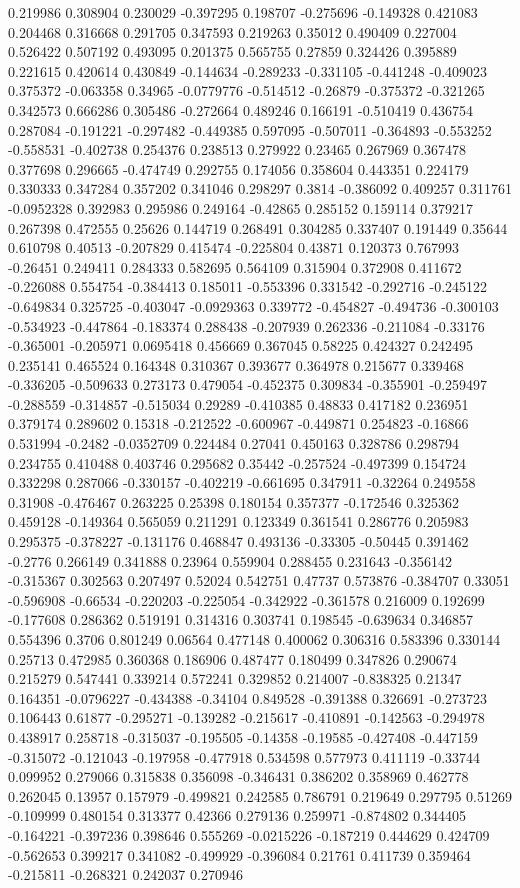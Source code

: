 0.219986 0.308904 0.230029 -0.397295 0.198707 -0.275696 -0.149328 0.421083 0.204468 0.316668 0.291705 0.347593 0.219263 0.35012 0.490409 0.227004 0.526422 0.507192 0.493095 0.201375 0.565755 0.27859 0.324426 0.395889 0.221615 0.420614 0.430849 -0.144634 -0.289233 -0.331105 -0.441248 -0.409023 0.375372 -0.063358 0.34965 -0.0779776 -0.514512 -0.26879 -0.375372 -0.321265 0.342573 0.666286 0.305486 -0.272664 0.489246 0.166191 -0.510419 0.436754 0.287084 -0.191221 -0.297482 -0.449385 0.597095 -0.507011 -0.364893 -0.553252 -0.558531 -0.402738 0.254376 0.238513 0.279922 0.23465 0.267969 0.367478 0.377698 0.296665 -0.474749 0.292755 0.174056 0.358604 0.443351 0.224179 0.330333 0.347284 0.357202 0.341046 0.298297 0.3814 -0.386092 0.409257 0.311761 -0.0952328 0.392983 0.295986 0.249164 -0.42865 0.285152 0.159114 0.379217 0.267398 0.472555 0.25626 0.144719 0.268491 0.304285 0.337407 0.191449 0.35644 0.610798 0.40513 -0.207829 0.415474 -0.225804 0.43871 0.120373 0.767993 -0.26451 0.249411 0.284333 0.582695 0.564109 0.315904 0.372908 0.411672 -0.226088 0.554754 -0.384413 0.185011 -0.553396 0.331542 -0.292716 -0.245122 -0.649834 0.325725 -0.403047 -0.0929363 0.339772 -0.454827 -0.494736 -0.300103 -0.534923 -0.447864 -0.183374 0.288438 -0.207939 0.262336 -0.211084 -0.33176 -0.365001 -0.205971 0.0695418 0.456669 0.367045 0.58225 0.424327 0.242495 0.235141 0.465524 0.164348 0.310367 0.393677 0.364978 0.215677 0.339468 -0.336205 -0.509633 0.273173 0.479054 -0.452375 0.309834 -0.355901 -0.259497 -0.288559 -0.314857 -0.515034 0.29289 -0.410385 0.48833 0.417182 0.236951 0.379174 0.289602 0.15318 -0.212522 -0.600967 -0.449871 0.254823 -0.16866 0.531994 -0.2482 -0.0352709 0.224484 0.27041 0.450163 0.328786 0.298794 0.234755 0.410488 0.403746 0.295682 0.35442 -0.257524 -0.497399 0.154724 0.332298 0.287066 -0.330157 -0.402219 -0.661695 0.347911 -0.32264 0.249558 0.31908 -0.476467 0.263225 0.25398 0.180154 0.357377 -0.172546 0.325362 0.459128 -0.149364 0.565059 0.211291 0.123349 0.361541 0.286776 0.205983 0.295375 -0.378227 -0.131176 0.468847 0.493136 -0.33305 -0.50445 0.391462 -0.2776 0.266149 0.341888 0.23964 0.559904 0.288455 0.231643 -0.356142 -0.315367 0.302563 0.207497 0.52024 0.542751 0.47737 0.573876 -0.384707 0.33051 -0.596908 -0.66534 -0.220203 -0.225054 -0.342922 -0.361578 0.216009 0.192699 -0.177608 0.286362 0.519191 0.314316 0.303741 0.198545 -0.639634 0.346857 0.554396 0.3706 0.801249 0.06564 0.477148 0.400062 0.306316 0.583396 0.330144 0.25713 0.472985 0.360368 0.186906 0.487477 0.180499 0.347826 0.290674 0.215279 0.547441 0.339214 0.572241 0.329852 0.214007 -0.838325 0.21347 0.164351 -0.0796227 -0.434388 -0.34104 0.849528 -0.391388 0.326691 -0.273723 0.106443 0.61877 -0.295271 -0.139282 -0.215617 -0.410891 -0.142563 -0.294978 0.438917 0.258718 -0.315037 -0.195505 -0.14358 -0.19585 -0.427408 -0.447159 -0.315072 -0.121043 -0.197958 -0.477918 0.534598 0.577973 0.411119 -0.33744 0.099952 0.279066 0.315838 0.356098 -0.346431 0.386202 0.358969 0.462778 0.262045 0.13957 0.157979 -0.499821 0.242585 0.786791 0.219649 0.297795 0.51269 -0.109999 0.480154 0.313377 0.42366 0.279136 0.259971 -0.874802 0.344405 -0.164221 -0.397236 0.398646 0.555269 -0.0215226 -0.187219 0.444629 0.424709 -0.562653 0.399217 0.341082 -0.499929 -0.396084 0.21761 0.411739 0.359464 -0.215811 -0.268321 0.242037 0.270946 
